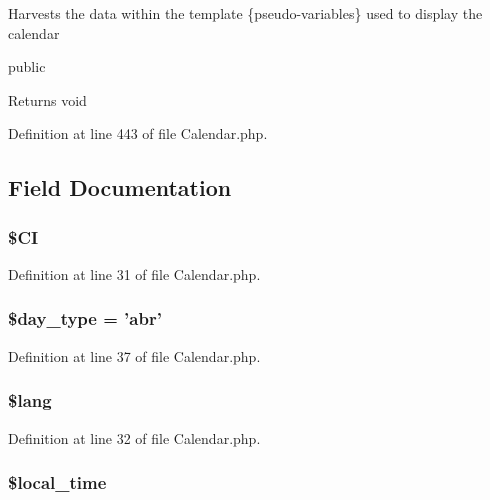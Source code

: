 Harvests the data within the template \{pseudo-\/variables\} used to display the calendar

public \begin{DoxyReturn}{Returns}
void 
\end{DoxyReturn}


Definition at line 443 of file Calendar.\-php.



\subsection{Field Documentation}
\hypertarget{class_c_i___calendar_ae0314d046ddf7fcfaec03222977427d3}{
\subsubsection[{\$\-C\-I}]{\setlength{\rightskip}{0pt plus 5cm}\$C\-I}}\label{class_c_i___calendar_ae0314d046ddf7fcfaec03222977427d3}


Definition at line 31 of file Calendar.\-php.

\hypertarget{class_c_i___calendar_a1e35fdb6b6cc297a6bb256517a8d813d}{
\subsubsection[{\$day\-\_\-type}]{\setlength{\rightskip}{0pt plus 5cm}\$day\-\_\-type = 'abr'}}\label{class_c_i___calendar_a1e35fdb6b6cc297a6bb256517a8d813d}


Definition at line 37 of file Calendar.\-php.

\hypertarget{class_c_i___calendar_a7714b111b644017933931ec69a154102}{
\subsubsection[{\$lang}]{\setlength{\rightskip}{0pt plus 5cm}\$lang}}\label{class_c_i___calendar_a7714b111b644017933931ec69a154102}


Definition at line 32 of file Calendar.\-php.

\hypertarget{class_c_i___calendar_a0233c9bb13f81d81d6e34641b25898da}{
\subsubsection[{\$local\-\_\-time}]{\setlength{\rightskip}{0pt plus 5cm}\$local\-\_\-time}}\label{class_c_i___calendar_a0233c9bb13f81d81d6e34641b25898da}


